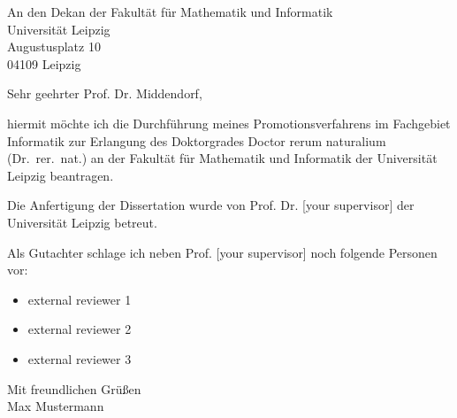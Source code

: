 \documentclass[
  fontsize=10pt,
  paper=a4,
  parskip=half,
  enlargefirstpage=true,    %
  fromalign=right,        %
  fromphone=on,           %
  fromrule=aftername,     %
  fromemail=true,         %
  addrfield=on,           %
  backaddress=on,         %
  subject=beforeopening,  %
  locfield=narrow,        %
  foldmarks=on,           %
]{scrlttr2}
\begin{document}
\emailname{\Email} %
\phonename{\Telefon} %
\setlength{\textheight}{13cm}



\begin{letter}{
An den Dekan der Fakult\"at f\"ur Mathematik und Informatik\\ 
Universit\"at Leipzig\\ 
Augustusplatz 10\\ 
04109 Leipzig}


\opening{Sehr geehrter Prof. Dr. Middendorf,} %

\smallskip

hiermit m\"ochte ich die Durchf\"uhrung meines Promotionsverfahrens
im Fachgebiet Informatik zur Erlangung des Doktorgrades
Doctor rerum naturalium (Dr.~rer.~nat.) an der Fakult\"at f\"ur
Mathematik und Informatik der Universit\"at Leipzig beantragen.

\smallskip

Die Anfertigung der Dissertation wurde von Prof. Dr. [your supervisor]
der Universit\"at Leipzig betreut.

\smallskip

Als Gutachter schlage ich neben Prof. [your supervisor] noch folgende Personen vor:

\begin{itemize}
	\item external reviewer 1
	\item external reviewer 2
	\item external reviewer 3
\end{itemize}


\closing{Mit freundlichen Grüßen\\[5pt]
Max Mustermann}


\end{letter}
\end{document}
